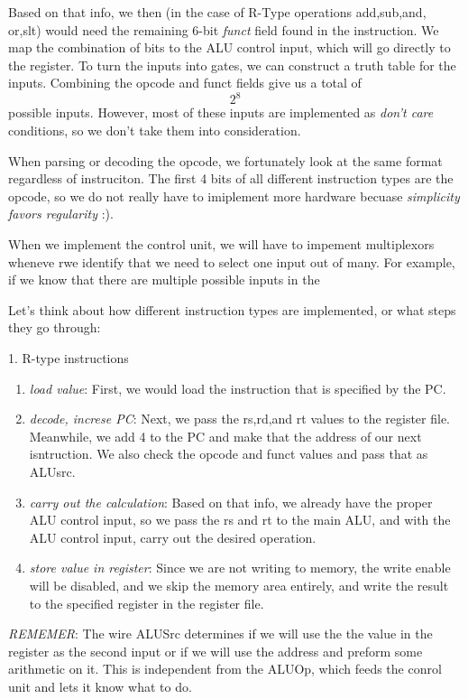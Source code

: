 \documentclass{article}
\begin{document}
Based on that info, we then (in the case of R-Type operations add,sub,and, or,slt) would need the remaining
6-bit \textit{funct} field found in the instruction. We map the combination of bits to the ALU control input, 
which will go directly to the register. To turn the inputs into gates, we can construct a truth table for the 
inputs. Combining the opcode and funct fields give us a total of 
\begin{equation}
		2^{8} 
\end{equation}
possible inputs. However, most of these inputs are implemented as \textit{don't care} conditions, so we don't 
take them into consideration.

When parsing or decoding the opcode, we fortunately look at the same format regardless of instruciton. The first
4 bits of all different instruction types are the opcode, so we do not really have to imiplement more hardware
becuase \textit{simplicity favors regularity} :).

When we implement the control unit, we will have to impement multiplexors wheneve rwe identify that we need to 
select one input out of many. For example, if we know that there are multiple possible inputs in the 

Let's think about how different instruction types are implemented, or what steps they go through:

1. R-type instructions
\begin{enumerate}
		\item{\textit{load value}}: First, we would load the instruction that is specified by the PC.
		\item{\textit{decode, increse PC}}: Next, we pass the rs,rd,and rt values to the register file.
				Meanwhile, we add 4 to the PC and make that the address of our next isntruction. We also 
				check the opcode and funct values and pass that as ALUsrc.
		\item{\textit{carry out the calculation}}: Based on that info, we already have the proper ALU control 
				input, so we pass the rs and rt to the main ALU, and with the ALU control input, carry out
				the desired operation.
		\item{\textit{store value in register}}: Since we are not writing to memory, the write enable will be 
				disabled, and we skip the memory area entirely, and write the result to the specified register
				in the register file.
\end{enumerate}
 
 \textit{REMEMER}: The wire ALUSrc determines if we will use the the value in the register as the second input 
 or if we will use the address and preform some arithmetic on it. This is independent from the ALUOp, which
 feeds the conrol unit and lets it know what to do.
\end{document}
